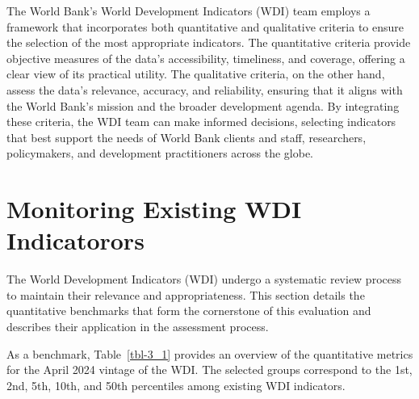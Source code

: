 \documentclass[
  11pt,
  a4paper,
  DIV=11,
  numbers=noendperiod]{scrreprt}
\begin{document}
The World Bank's World Development Indicators (WDI) team employs a
framework that incorporates both quantitative and qualitative criteria
to ensure the selection of the most appropriate indicators. The
quantitative criteria provide objective measures of the data's
accessibility, timeliness, and coverage, offering a clear view of its
practical utility. The qualitative criteria, on the other hand, assess
the data's relevance, accuracy, and reliability, ensuring that it aligns
with the World Bank's mission and the broader development agenda. By
integrating these criteria, the WDI team can make informed decisions,
selecting indicators that best support the needs of World Bank clients
and staff, researchers, policymakers, and development practitioners
across the globe.


\chapter{Monitoring Existing WDI
Indicatorors}\label{monitoring-existing-wdi-indicatorors}

The World Development Indicators (WDI) undergo a systematic review
process to maintain their relevance and appropriateness. This section
details the quantitative benchmarks that form the cornerstone of this
evaluation and describes their application in the assessment process.

As a benchmark, Table~\ref{tbl-3_1} provides an overview of the
quantitative metrics for the April 2024 vintage of the WDI. The selected
groups correspond to the 1st, 2nd, 5th, 10th, and 50th percentiles among
existing WDI indicators.
\end{document}
